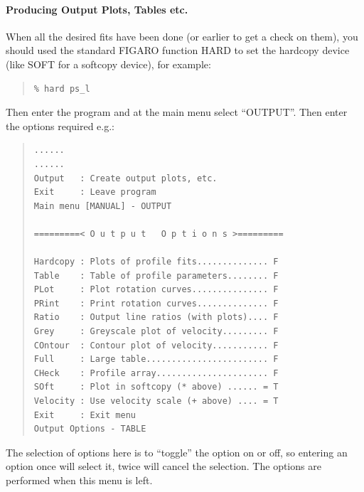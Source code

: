 \documentclass[11pt,twoside]{article}
\newcommand{\xref}[3]{#1}
\begin{document}
\paragraph{Producing Output Plots, Tables etc.}
\label{long.out}

When all the desired fits have been done (or earlier to get a check on
them), you should used the standard \xref{FIGARO}{sun86}{} function
HARD to set the hardcopy device (like SOFT for a softcopy device), for
example:

\begin{quote}\begin{verbatim}
% hard ps_l
\end{verbatim}\end{quote}

Then enter the program and at the main menu select ``OUTPUT''. Then
enter the options required e.g.:

\begin{quote}\begin{verbatim}
......
......
Output   : Create output plots, etc.
Exit     : Leave program
Main menu [MANUAL] - OUTPUT

=========< O u t p u t   O p t i o n s >=========

Hardcopy : Plots of profile fits.............. F
Table    : Table of profile parameters........ F
PLot     : Plot rotation curves............... F
PRint    : Print rotation curves.............. F
Ratio    : Output line ratios (with plots).... F
Grey     : Greyscale plot of velocity......... F
COntour  : Contour plot of velocity........... F
Full     : Large table........................ F
CHeck    : Profile array...................... F
SOft     : Plot in softcopy (* above) ...... = T
Velocity : Use velocity scale (+ above) .... = T
Exit     : Exit menu
Output Options - TABLE
\end{verbatim}\end{quote}

The selection of options here is to ``toggle'' the option on or off,
so entering an option once will select it, twice will cancel the
selection. The options are performed when this menu is left.
\end{document}
